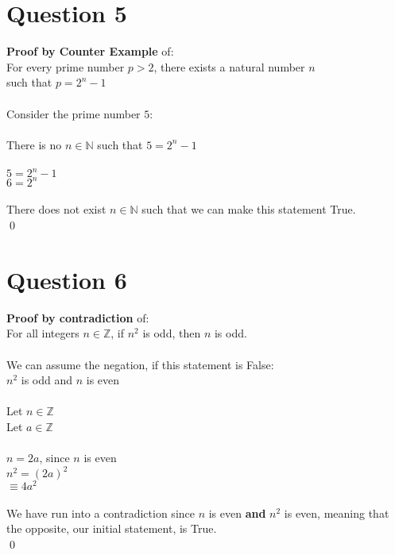 \documentclass{article}
\begin{document}
    \newpage
    \section*{Question 5}
    \textbf{Proof by Counter Example} of: \\
    \indent For every prime number $p > 2$, there exists a natural number $n$\\ \indent such that $p = 2^n - 1$ \\ \\
    Consider the prime number $5$: \\ \\
    \indent There is no $n \in \mathbb{N}$ such that $5 = 2^n -1$ \\ \\
    \indent $5 = 2^n - 1$ \\
    \indent $6 = 2^n$ \\ \\
    There does not exist $n \in \mathbb{N}$ such that we can make this statement True. \\ \qed
    \newpage
    \section*{Question 6}
    \textbf{Proof by contradiction} of: \\
    \indent For all integers $n \in \mathbb{Z}$, if $n^2$ is odd, then $n$ is odd. \\ \\
    We can assume the negation, if this statement is False:\\
    \indent $n^2$ is odd and $n$ is even \\ \\
    Let $n \in \mathbb{Z}$ \\
    Let $a \in \mathbb{Z}$ \\ \\
    $n = 2a$, since $n$ is even \\
    $n^2 = (2a)^2$ \\
    $\equiv 4a^2$ \\ \\
    We have run into a contradiction since $n$ is even \textbf{and} $n^2$ is even, meaning that the opposite, our initial statement, is True. \\ \qed
    
  

   
\end{document}
